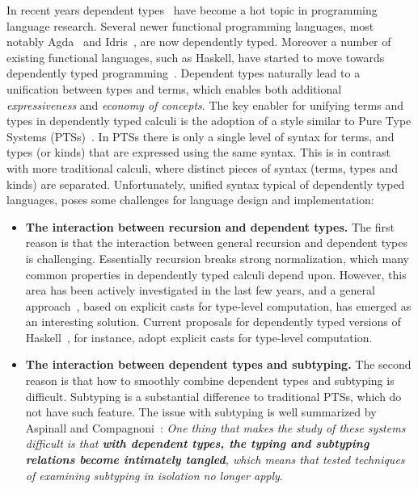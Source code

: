 In recent years dependent
types~\cite{coc,cayenne,dep:pisigma,sjoberg:msfp12,guru,fc:kind,zombie:popl14,zombie:popl15} 
have become a hot topic in programming
language research. Several newer
functional programming languages, most notably Agda~\cite{2007_norell_agda} and
Idris~\cite{brady2013idris}, are now dependently typed. Moreover a number of existing functional
languages, such as Haskell, have started to move towards dependently typed programming~\cite{dependenthaskell}. Dependent types naturally lead to a unification between types and terms, which enables both
additional \emph{expressiveness} and \emph{economy of concepts}. 
The key enabler for unifying terms and types in dependently typed
calculi is the adoption of a style similar to 
Pure Type Systems (PTSs)~\cite{pts}. In PTSs there is only a single level 
of syntax for terms, and types (or kinds) that are expressed using the 
same syntax. This is in contrast with more traditional calculi, where 
distinct pieces of syntax (terms, types and kinds) are separated.
Unfortunately, unified syntax typical of dependently typed languages,
poses some challenges for language design and implementation:

\begin{itemize}

\item  {\bf The interaction between recursion and dependent types.}
 The first reason is that the
interaction between general recursion and dependent types is
challenging. Essentially recursion breaks strong normalization, which 
many common properties in dependently typed calculi depend upon.
However, this area has been actively investigated in the
last few years, and a general approach~\cite{guru,sjoberg:msfp12, kimmel:plpv, zombie:popl15,
  isotype}, based on explicit 
casts for type-level computation, has emerged as an interesting
solution. Current proposals for dependently typed versions of Haskell~\cite{dependenthaskell},
for instance, adopt explicit casts for type-level computation.

\item {\bf The interaction between dependent types and subtyping.}
The second reason is that how to smoothly combine
dependent types and subtyping is difficult. Subtyping is a
substantial difference to traditional PTSs, which do not have such feature.
The issue with subtyping 
is well summarized by Aspinall and Compagnoni~\cite{subdep}:
\emph{
One thing that makes the study of these systems difficult is that {\bf
  with
dependent types, the typing and subtyping relations become intimately
tangled}, which means that tested techniques of examining subtyping in
isolation no longer apply}.

\end{itemize}

